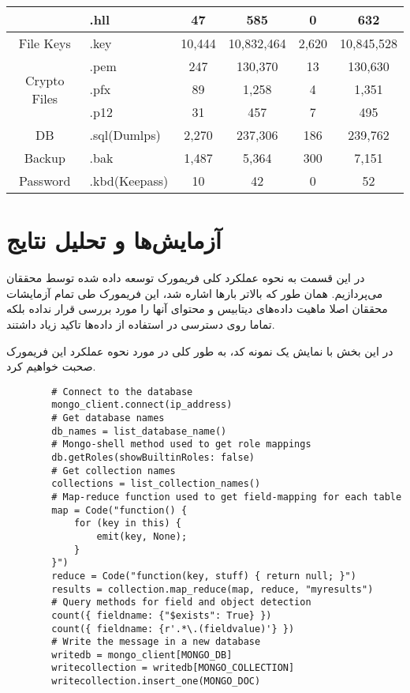 \documentclass[10pt, a4paper]{article}
\begin{document}
\begin{LTR}
\begin{table}[!h]
{\begin{tabular}{|c|l|ccc|c|}
                & .hll & 47 & 585 & 0 & 632 \\ \hline
                File Keys & .key & 10,444 & 10,832,464 & 2,620 & 10,845,528 \\ \hline
                \multirow{3}{*}{Crypto Files}
                & .pem & 247 & 130,370 & 13 & 130,630 \\
                & .pfx & 89 & 1,258 & 4 & 1,351  \\
                & .p12 & 31 & 457 & 7 & 495 \\ \hline
                DB & .sql(Dumlps) & 2,270 & 237,306 & 186 & 239,762 \\ \hline
                Backup & .bak & 1,487 & 5,364 & 300 & 7,151 \\ \hline
                Password & .kbd(Keepass) & 10 & 42 & 0 & 52 \\ \hline
            \end{tabular}
        }
    \end{table}
\end{LTR}

\newpage

\section{آزمایش‌ها و تحلیل نتایج}

در‌ این قسمت به نحوه عملکرد کلی فریمورک توسعه داده شده توسط محققان می‌پردازیم.
همان طور که بالاتر بارها اشاره شد، این فریمورک طی تمام آزمایشات محققان اصلا
ماهیت داده‌های دیتابیس و محتوای آنها را مورد بررسی قرار نداده بلکه تماما روی
دسترسی در استفاده از داده‌ها تاکید زیاد داشتند.

در این بخش با نمایش یک نمونه کد، به طور کلی در مورد نحوه عملکرد این فریمورک صحبت
خواهیم کرد.

\begin{LTR}
    \begin{lstlisting}
        # Connect to the database
        mongo_client.connect(ip_address)
        # Get database names
        db_names = list_database_name()
        # Mongo-shell method used to get role mappings
        db.getRoles(showBuiltinRoles: false)
        # Get collection names
        collections = list_collection_names()
        # Map-reduce function used to get field-mapping for each table
        map = Code("function() {
            for (key in this) {
                emit(key, None);
            }
        }")
        reduce = Code("function(key, stuff) { return null; }")
        results = collection.map_reduce(map, reduce, "myresults")
        # Query methods for field and object detection
        count({ fieldname: {"$exists": True} })
        count({ fieldname: {r'.*\.(fieldvalue)'} })
        # Write the message in a new database
        writedb = mongo_client[MONGO_DB]
        writecollection = writedb[MONGO_COLLECTION]
        writecollection.insert_one(MONGO_DOC)
    \end{lstlisting}
\end{LTR}
\end{document}
